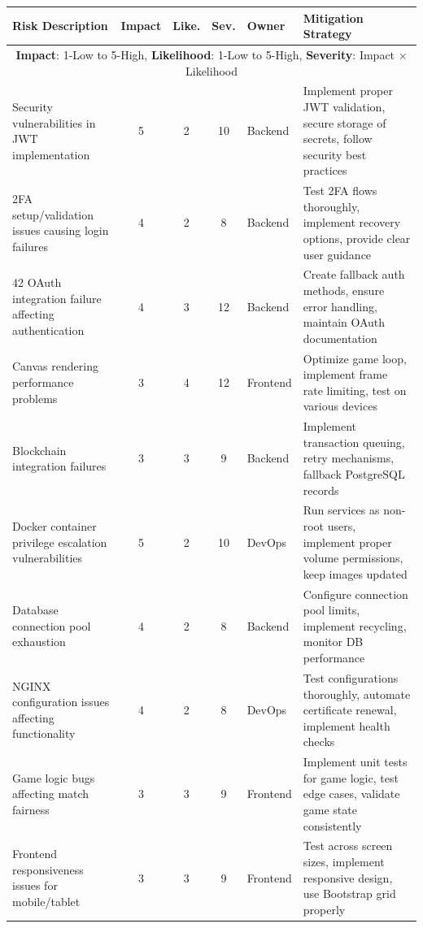 \begin{table}[H]
    \footnotesize
    \centering
    \renewcommand{\arraystretch}{1.2} %
    \begin{tabular}{|p{3.2cm}|c|c|c|p{1.5cm}|p{5cm}|}
    \hline
    \textbf{Risk Description} & \textbf{Impact} & \textbf{Like.} & \textbf{Sev.} & \textbf{Owner} & \textbf{Mitigation Strategy} \\
    \hline
    \multicolumn{6}{|c|}{\textbf{Impact}: 1-Low to 5-High, \textbf{Likelihood}: 1-Low to 5-High, \textbf{Severity}: Impact × Likelihood} \\
    \hline
    Security vulnerabilities in JWT implementation & 5 & 2 & 10 & Backend & Implement proper JWT validation, secure storage of secrets, follow security best practices \\
    \hline
    2FA setup/validation issues causing login failures & 4 & 2 & 8 & Backend & Test 2FA flows thoroughly, implement recovery options, provide clear user guidance \\
    \hline
    42 OAuth integration failure affecting authentication & 4 & 3 & 12 & Backend & Create fallback auth methods, ensure error handling, maintain OAuth documentation \\
    \hline
    Canvas rendering performance problems & 3 & 4 & 12 & Frontend & Optimize game loop, implement frame rate limiting, test on various devices \\
    \hline
    Blockchain integration failures & 3 & 3 & 9 & Backend & Implement transaction queuing, retry mechanisms, fallback PostgreSQL records \\
    \hline
    Docker container privilege escalation vulnerabilities & 5 & 2 & 10 & DevOps & Run services as non-root users, implement proper volume permissions, keep images updated \\
    \hline
    Database connection pool exhaustion & 4 & 2 & 8 & Backend & Configure connection pool limits, implement recycling, monitor DB performance \\
    \hline
    NGINX configuration issues affecting functionality & 4 & 2 & 8 & DevOps & Test configurations thoroughly, automate certificate renewal, implement health checks \\
    \hline
    Game logic bugs affecting match fairness & 3 & 3 & 9 & Frontend & Implement unit tests for game logic, test edge cases, validate game state consistently \\
    \hline
    Frontend responsiveness issues for mobile/tablet & 3 & 3 & 9 & Frontend & Test across screen sizes, implement responsive design, use Bootstrap grid properly \\

\end{tabular}
\end{table}

